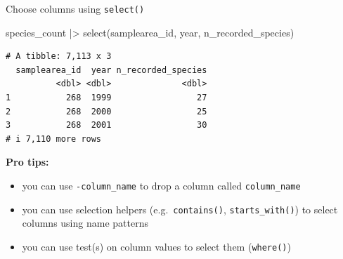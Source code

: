 \documentclass[
  ignorenonframetext,
  aspectratio=169,
]{beamer}
\newenvironment{Shaded}{\begin{snugshade}}{\end{snugshade}}
\newcommand{\FunctionTok}[1]{\textcolor[rgb]{0.28,0.35,0.67}{#1}}
\newcommand{\NormalTok}[1]{\textcolor[rgb]{0.00,0.23,0.31}{#1}}
\newcommand{\SpecialCharTok}[1]{\textcolor[rgb]{0.37,0.37,0.37}{#1}}
\providecommand{\tightlist}{%
  \setlength{\itemsep}{0pt}\setlength{\parskip}{0pt}}
\let\oldtexttt\texttt
\renewcommand{\texttt}[1]{\colorbox{gray!20}{\oldtexttt{#1}}}
\begin{document}
\begin{frame}[fragile]{Choose columns using \texttt{select()}}
\protect{}\label{choose-columns-using-select}
\footnotesize

\begin{Shaded}
\begin{Highlighting}[]
\NormalTok{species\_count }\SpecialCharTok{|\textgreater{}} \FunctionTok{select}\NormalTok{(samplearea\_id, year, n\_recorded\_species)}
\end{Highlighting}
\end{Shaded}

\begin{verbatim}
# A tibble: 7,113 x 3
  samplearea_id  year n_recorded_species
          <dbl> <dbl>              <dbl>
1           268  1999                 27
2           268  2000                 25
3           268  2001                 30
# i 7,110 more rows
\end{verbatim}

\normalsize

\pause

\textbf{Pro tips:}

\begin{itemize}
\tightlist
\item
  you can use \texttt{-column\_name} to drop a column called
  \texttt{column\_name}
\item
  you can use selection helpers (e.g.~\texttt{contains()},
  \texttt{starts\_with()}) to select columns using name patterns
\item
  you can use test(s) on column values to select them (\texttt{where()})
\end{itemize}
\end{frame}
\end{document}
